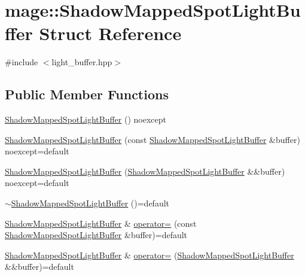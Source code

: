 \hypertarget{structmage_1_1_shadow_mapped_spot_light_buffer}{}\section{mage\+:\+:Shadow\+Mapped\+Spot\+Light\+Buffer Struct Reference}
\label{structmage_1_1_shadow_mapped_spot_light_buffer}


{\ttfamily \#include $<$light\+\_\+buffer.\+hpp$>$}

\subsection*{Public Member Functions}
\begin{DoxyCompactItemize}
\item 
\hyperlink{structmage_1_1_shadow_mapped_spot_light_buffer_a6d4633c3f9466589c99ab55c11daf940}{Shadow\+Mapped\+Spot\+Light\+Buffer} () noexcept
\item 
\hyperlink{structmage_1_1_shadow_mapped_spot_light_buffer_a78f9b207eca1b61bd433b5a6c731e549}{Shadow\+Mapped\+Spot\+Light\+Buffer} (const \hyperlink{structmage_1_1_shadow_mapped_spot_light_buffer}{Shadow\+Mapped\+Spot\+Light\+Buffer} \&buffer) noexcept=default
\item 
\hyperlink{structmage_1_1_shadow_mapped_spot_light_buffer_aa4b579dd9b8085fc233f4e71b29757c5}{Shadow\+Mapped\+Spot\+Light\+Buffer} (\hyperlink{structmage_1_1_shadow_mapped_spot_light_buffer}{Shadow\+Mapped\+Spot\+Light\+Buffer} \&\&buffer) noexcept=default
\item 
\hyperlink{structmage_1_1_shadow_mapped_spot_light_buffer_a2f403876460633aa03f1ad42d0eca653}{$\sim$\+Shadow\+Mapped\+Spot\+Light\+Buffer} ()=default
\item 
\hyperlink{structmage_1_1_shadow_mapped_spot_light_buffer}{Shadow\+Mapped\+Spot\+Light\+Buffer} \& \hyperlink{structmage_1_1_shadow_mapped_spot_light_buffer_a80cd7b7d4c148c362e09cbf6c55dc045}{operator=} (const \hyperlink{structmage_1_1_shadow_mapped_spot_light_buffer}{Shadow\+Mapped\+Spot\+Light\+Buffer} \&buffer)=default
\item 
\hyperlink{structmage_1_1_shadow_mapped_spot_light_buffer}{Shadow\+Mapped\+Spot\+Light\+Buffer} \& \hyperlink{structmage_1_1_shadow_mapped_spot_light_buffer_a2548124593b08822df6b3d7ded13b32e}{operator=} (\hyperlink{structmage_1_1_shadow_mapped_spot_light_buffer}{Shadow\+Mapped\+Spot\+Light\+Buffer} \&\&buffer)=default
\end{DoxyCompactItemize}
